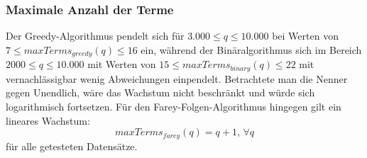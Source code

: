 

\subsubsection{Maximale Anzahl der Terme}
 Der Greedy-Algorithmus pendelt sich für $3.000 \leq q \leq 10.000$ bei Werten von $7 \leq maxTerms_{greedy}(q) \leq 16$ ein, während der Binäralgorithmus sich im Bereich $2000 \leq q \leq 10.000$ mit Werten von $15 \leq maxTerms_{binary}(q) \leq 22$ mit vernachlässigbar wenig Abweichungen einpendelt. Betrachtete man die Nenner gegen Unendlich, wäre das Wachstum nicht beschränkt und würde sich logarithmisch fortsetzen. Für den Farey-Folgen-Algorithmus hingegen gilt ein lineares Wachstum:
$$maxTerms_{farey}(q) = q + 1, \, \forall q$$
für alle getesteten Datensätze. 



